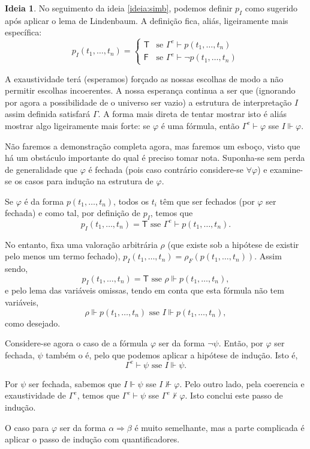 \documentclass{report}
\theoremstyle{definition}
\newtheorem{ideia}{Ideia}
\theoremstyle{remark}
\newcommand{\lt}{\mathsf{T}}
\newcommand{\lf}{\mathsf{F}}
\newcommand{\imply}{\mathbin{\Rightarrow}}
\begin{document}
	\begin{ideia}
	No seguimento da ideia \ref{ideia:simb}, podemos definir $p_I$ como sugerido após aplicar o lema de Lindenbaum. A definição fica, aliás, ligeiramente mais específica:
	\[p_I(t_1, \dots, t_n) = \begin{cases}
	\lt &\text{se $\Gamma^e \vdash p(t_1, \dots, t_n)$}\\
	\lf &\text{se $\Gamma^e \vdash \neg p(t_1, \dots, t_n)$}
	\end{cases}\]
	
	A exaustividade terá (esperamos) forçado as nossas escolhas de modo a não permitir escolhas incoerentes. A nossa esperança continua a ser que (ignorando por agora a possibilidade de o universo ser vazio) a estrutura de interpretação $I$ assim definida satisfará $\Gamma$. A forma mais direta de tentar mostrar isto é aliás mostrar algo ligeiramente mais forte: se $\varphi$ é uma fórmula, então $\Gamma^e \vdash \varphi$ sse $I \Vdash \varphi$.
	
	Não faremos a demonstração completa agora, mas faremos um esboço, visto que há um obstáculo importante do qual é preciso tomar nota. Suponha-se sem perda de generalidade que $\varphi$ é fechada (pois caso contrário considere-se $\forall \varphi$) e examine-se os casos para indução na estrutura de $\varphi$.
	
	Se $\varphi$ é da forma $p(t_1, \dots, t_n)$, todos os $t_i$ têm que ser fechados (por $\varphi$ ser fechada) e como tal, por definição de $p_I$, temos que
	\[p_I(t_1, \dots, t_n) = \lt \text{ sse } \Gamma^e \vdash p(t_1, \dots, t_n).\]
	
	No entanto, fixa uma valoração arbitrária $\rho$ (que existe sob a hipótese de existir pelo menos um termo fechado), $p_I(t_1, \dots, t_n) = \rho_F(p(t_1, \dots, t_n))$. Assim sendo,
	\[p_I(t_1, \dots, t_n) = \lt \text{ sse } \rho \Vdash p(t_1, \dots, t_n),\]
	e pelo lema das variáveis omissas, tendo em conta que esta fórmula não tem variáveis,
	\[\rho \Vdash p(t_1, \dots, t_n) \text{ sse } I \Vdash p(t_1, \dots, t_n),\]
	como desejado.
	
	Considere-se agora o caso de a fórmula $\varphi$ ser da forma $\neg \psi$. Então, por $\varphi$ ser fechada, $\psi$ também o é, pelo que podemos aplicar a hipótese de indução. Isto é,
	\[\Gamma^e \vdash \psi \text{ sse } I \Vdash \psi.\]
	
	Por $\psi$ ser fechada, sabemos que $I \Vdash \psi$ sse $I \nVdash \varphi$. Pelo outro lado, pela coerencia e exaustividade de $\Gamma^e$, temos que $\Gamma^e \vdash \psi$ sse $\Gamma^e \nvdash \varphi$. Isto conclui este passo de indução.
	
	O caso para $\varphi$ ser da forma $\alpha \imply \beta$ é muito semelhante, mas a parte complicada é aplicar o passo de indução com quantificadores.
	\end{ideia}
	
\end{document}
